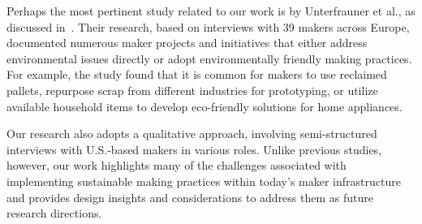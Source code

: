 Perhaps the most pertinent study related to our work is by Unterfrauner et al., as discussed in~\cite{unterfrauner2017environmental}. Their research, based on interviews with 39 makers across Europe, documented numerous maker projects and initiatives that either address environmental issues directly or adopt environmentally friendly making practices. 
For example, the study found that it is common for makers to use reclaimed pallets, repurpose scrap from different industries for prototyping, or utilize available household items to develop eco-friendly solutions for home appliances.

Our research also adopts a qualitative approach, involving semi-structured interviews with U.S.-based makers in various roles. Unlike previous studies, however, our work highlights many of the challenges associated with implementing sustainable making practices within today's maker infrastructure and provides design insights and considerations to address them as future research directions.